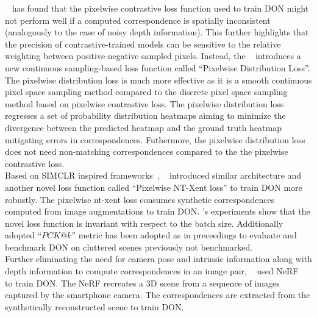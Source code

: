 \citeauthor{florence2020dense}~\cite{florence2020dense} has found that the pixelwise contrastive loss function used to train \ac{DON} might not perform well if a computed
correspondence is spatially inconsistent (analogously to the case of noisy depth information). This further highlights that the precision of contrastive-trained models can be sensitive to the
relative weighting between positive-negative sampled pixels. Instead, the \citeauthor{florence2020dense}~\cite{florence2020dense} introduces a new continuous
sampling-based loss function called ``Pixelwise Distribution Loss''.
The pixelwise distribution loss is much more effective as it is a smooth continuous pixel space sampling method compared to the discrete pixel space sampling method based on pixelwise contrastive loss.
The pixelwise distribution loss regresses a set of probability distribution heatmaps aiming to minimize the divergence between the predicted
heatmap and the ground truth heatmap mitigating errors in correspondences. Futhermore, the pixelwise distribution loss does not need non-matching correspondences compared to the
the pixelwise contrastive loss.\\

Based on SIMCLR inspired frameworks~\parencites{chen2020simple}{zbontar2021barlow},
\citeauthor{adrian2022efficient}~\cite{adrian2022efficient} introduced similar architecture and another novel loss function called ``Pixelwise NT-Xent loss'' to train \ac{DON} more robustly.
The pixelwise nt-xent loss consumes synthetic correspondences computed from image augmentations to train \ac{DON}.
\citeauthor{adrian2022efficient}'s experiments show that the novel loss function is invariant with respect to the batch size. Additionally adopted ``$PCK@k$''
metric has been adopted as in preceedings \parencites{chai2019multi}{fathy2018hierarchical} to evaluate and benchmark \ac{DON} on cluttered scenes previously not benchmarked.\\

Further eliminating the need for camera pose and intrinsic information along with depth information to compute correspondences in an image pair, \citeauthor{nerf-Supervision}~\cite{nerf-Supervision} used
\ac{NeRF}~\cite{mildenhall2021nerf} to train \ac{DON}. The \ac{NeRF} recreates a 3D scene from a sequence of images captured by the smartphone camera. The correspondences are extracted from
the synthetically reconstructed scene to train \ac{DON}.\\

